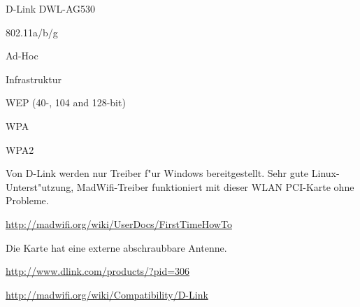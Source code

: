 %
%
\begin{wlandevice}{D-Link DWL-AG530}



\begin{wlanieeestandard}
\item 802.11a/b/g
\end{wlanieeestandard}

\begin{wlanmode}
\item Ad-Hoc
\item Infrastruktur
\end{wlanmode}

\begin{wlansecurity}
\item WEP (40-, 104 and 128-bit)
\item WPA
\item WPA2
\end{wlansecurity}

\begin{wlandriver}
\item
Von D-Link werden nur Treiber f"ur Windows bereitgestellt. Sehr gute Linux-
Unterst"utzung, MadWifi-Treiber funktioniert mit dieser WLAN PCI-Karte
ohne Probleme.
\end{wlandriver}


\begin{wlaninstall}
\item \url{http://madwifi.org/wiki/UserDocs/FirstTimeHowTo}
\end{wlaninstall}

\begin{wlanextrainfo}
\item
Die Karte hat eine externe abschraubbare Antenne.
\end{wlanextrainfo}

\begin{wlanlink}
\item \url{http://www.dlink.com/products/?pid=306}
\item \url{http://madwifi.org/wiki/Compatibility/D-Link}
\end{wlanlink}

\end{wlandevice}

